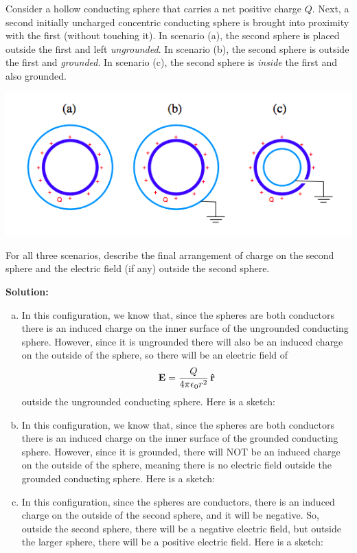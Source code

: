 \documentclass[11pt]{article}
\newcommand{\be}{\begin{enumerate}[a) ]}
\newcommand{\ee}{\end{enumerate}}
\begin{document}
\begin{problem}[5.]
Consider a hollow conducting sphere that carries a net positive charge $Q$. Next, a second
initially uncharged concentric conducting sphere is brought into proximity with the first
(without touching it). In scenario (a), the second sphere is placed outside the first and left
\textit{ungrounded}. In scenario (b), the second sphere is outside the first and \textit{grounded}. In
scenario (c), the second sphere is \textit{inside} the first and also grounded.
\begin{center}
\includegraphics[scale=0.5]{prob5.png}
\end{center}
For all three scenarios, describe the final arrangement of charge on the second sphere and
the electric field (if any) outside the second sphere.
\end{problem}


\textbf{Solution:}\be
\item In this configuration, we know that, since the spheres are both conductors there is an induced charge on the inner surface of the ungrounded conducting sphere. However, since it is ungrounded there will also be an induced charge on the outside of the sphere, so there will be an electric field of
\[
	\mathbf{E} = \frac{Q}{4\pi\epsilon_0r^2}\,\mathbf{\hat{r}}
\]
outside the ungrounded conducting sphere. Here is a sketch:

\item In this configuration, we know that, since the spheres are both conductors there is an induced charge on the inner surface of the grounded conducting sphere. However, since it is grounded, there will NOT be an induced charge on the outside of the sphere, meaning there is no electric field outside the grounded conducting sphere. Here is a sketch:
\vspace{1cm}
\item In this configuration, since the spheres are conductors, there is an induced charge on the outside of the second sphere, and it will be negative. So, outside the second sphere, there will be a negative electric field, but outside the larger sphere, there will be a positive electric field. Here is a sketch:
\ee
\end{document}
